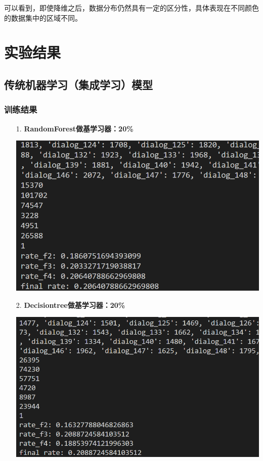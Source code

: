 \documentclass[11pt]{article}
\begin{document}
            可以看到，即使降维之后，数据分布仍然具有一定的区分性，具体表现在不同颜色的数据集中的区域不同。

    \section{实验结果}
        \subsection{传统机器学习（集成学习）模型}
            \subsubsection{训练结果}
            \begin{enumerate}
                \item [1. ]\textbf{RandomForest做基学习器：20\%}
                \begin{center}
                    \includegraphics[scale=1]{graph/result1.png}
                \end{center}
                \item [2. ]\textbf{Decisiontree做基学习器：20\%}
                \begin{center}
                    \includegraphics[scale=1]{graph/result2.png}

\end{center}
\end{enumerate}
\end{document}
